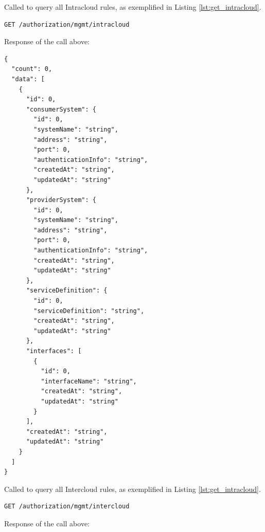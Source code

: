 \documentclass[a4paper]{arrowhead}
\newcommand{\fref}[1]{{\textcolor{ArrowheadBlue}{\hyperref[sec:functions:#1]{#1}}}}
\begin{document}

Called to query all Intracloud rules, as exemplified in Listing \ref{lst:get_intracloud}.

\begin{lstlisting}[language=http,label={lst:get_intracloud},caption={A \fref{Get all Intracloud rules} invocation.}]
GET /authorization/mgmt/intracloud
\end{lstlisting}

Response of the call above:

\begin{lstlisting}[language=http,label={lst:get_intracloud_res},caption={A \fref{Get all Intracloud rules} response is an IntracloudRuleList}]
{
  "count": 0,
  "data": [
    {
      "id": 0,
      "consumerSystem": {
        "id": 0,
        "systemName": "string",
        "address": "string",
        "port": 0,
        "authenticationInfo": "string",
        "createdAt": "string",
        "updatedAt": "string"
      },
      "providerSystem": {
        "id": 0,
        "systemName": "string",
        "address": "string",
        "port": 0,
        "authenticationInfo": "string",
        "createdAt": "string",
        "updatedAt": "string"
      },
      "serviceDefinition": {
        "id": 0,
        "serviceDefinition": "string",
        "createdAt": "string",
        "updatedAt": "string"
      },
      "interfaces": [
        {
          "id": 0,
          "interfaceName": "string",
          "createdAt": "string",
          "updatedAt": "string"
        }
      ],
      "createdAt": "string",
      "updatedAt": "string"
    }
  ]
}
\end{lstlisting}


Called to query all Intercloud rules, as exemplified in Listing \ref{lst:get_intracloud}.

\begin{lstlisting}[language=http,label={lst:get_intercloud},caption={A \fref{Get all Intercloud rules} invocation.}]
GET /authorization/mgmt/intercloud
\end{lstlisting}

Response of the call above:
\end{document}
